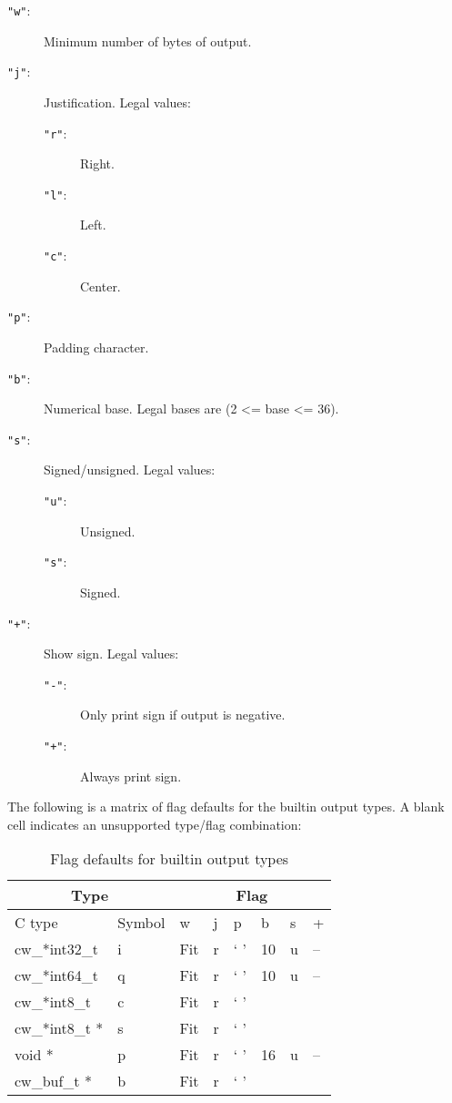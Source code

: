 \begin{description}
\item[{\tt "w"}: ]
	Minimum number of bytes of output.
\item[{\tt "j"}: ]
	Justification.  Legal values:
	\begin{description}
	\item[{\tt "r"}: ]
		Right.
	\item[{\tt "l"}: ]
		Left.
	\item[{\tt "c"}: ]
		Center.
	\end{description}
\item[{\tt "p"}: ]
	 Padding character.
\item[{\tt "b"}: ]
	Numerical base.  Legal bases are (2 <= base <= 36).
\item[{\tt "s"}: ]
	Signed/unsigned.  Legal values:
	\begin{description}
	\item[{\tt "u"}: ]
		 Unsigned.
	\item[{\tt "s"}: ]
		Signed.
	\end{description}
\item[{\tt "+"}: ]
	Show sign.  Legal values:
	\begin{description}
	\item[{\tt "-"}: ]
		Only print sign if output is negative.
	\item[{\tt "+"}: ]
		Always print sign.
	\end{description}
\end{description}

The following is a matrix of flag defaults for the builtin output types.  A
blank cell indicates an unsupported type/flag combination:
\begin{table}[htb]
\begin{center}
\begin{tabular}{|l|l||l|l|l|l|l|l|}
\hline
\multicolumn{2}{|c||}{Type} & \multicolumn{6}{c|}{Flag} \\
\hline
C type		& Symbol & w	& j	& p	& b	& s	& +	\\
\hline \hline
cw\_*int32\_t	& i	& Fit	& r	& ` '	& 10	& u	& --	\\
\hline
cw\_*int64\_t	& q	& Fit	& r	& ` '	& 10	& u	& --	\\
\hline
cw\_*int8\_t	& c	& Fit	& r	& ` '	&	&	&	\\
\hline
cw\_*int8\_t *	& s	& Fit	& r	& ` '	&	&	&	\\
\hline
void *		& p	& Fit	& r	& ` '	& 16	& u	& --	\\
\hline
cw\_buf\_t *	& b	& Fit	& r	& ` '	&	&	&	\\
\hline
\end{tabular}
\end{center}
\caption{Flag defaults for builtin output types}
\end{table}

